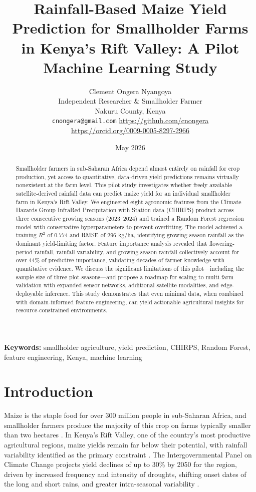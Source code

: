 \documentclass[11pt,a4paper]{article}
\title{Rainfall-Based Maize Yield Prediction for Smallholder Farms\\in Kenya's Rift Valley: A Pilot Machine Learning Study}
\author{
Clement Ongera Nyangoya\\[0.3em]
\small Independent Researcher \& Smallholder Farmer\\
\small Nakuru County, Kenya\\[0.3em]
\small \texttt{cnongera@gmail.com} \quad \url{https://github.com/cnongera}\\[0.3em]
\small \url{https://orcid.org/0009-0005-8297-2966}
}
\date{May 2026}
\begin{document}
\maketitle

\begin{abstract}
Smallholder farmers in sub-Saharan Africa depend almost entirely on rainfall for crop production, yet access to quantitative, data-driven yield predictions remains virtually nonexistent at the farm level. This pilot study investigates whether freely available satellite-derived rainfall data can predict maize yield for an individual smallholder farm in Kenya's Rift Valley. We engineered eight agronomic features from the Climate Hazards Group InfraRed Precipitation with Station data (CHIRPS) product across three consecutive growing seasons (2023--2024) and trained a Random Forest regression model with conservative hyperparameters to prevent overfitting. The model achieved a training $R^2$ of 0.774 and RMSE of 296 kg/ha, identifying growing-season rainfall as the dominant yield-limiting factor. Feature importance analysis revealed that flowering-period rainfall, rainfall variability, and growing-season rainfall collectively account for over 44\% of predictive importance, validating decades of farmer knowledge with quantitative evidence. We discuss the significant limitations of this pilot---including the sample size of three plot-seasons---and propose a roadmap for scaling to multi-farm validation with expanded sensor networks, additional satellite modalities, and edge-deployable inference. This study demonstrates that even minimal data, when combined with domain-informed feature engineering, can yield actionable agricultural insights for resource-constrained environments.
\end{abstract}

\textbf{Keywords:} smallholder agriculture, yield prediction, CHIRPS, Random Forest, feature engineering, Kenya, machine learning

\section{Introduction}

Maize is the staple food for over 300 million people in sub-Saharan Africa, and smallholder farmers produce the majority of this crop on farms typically smaller than two hectares \cite{faostat2023}. In Kenya's Rift Valley, one of the country's most productive agricultural regions, maize yields remain far below their potential, with rainfall variability identified as the primary constraint \cite{waithaka2006}. The Intergovernmental Panel on Climate Change projects yield declines of up to 30\% by 2050 for the region, driven by increased frequency and intensity of droughts, shifting onset dates of the long and short rains, and greater intra-seasonal variability \cite{ipcc2022}.
\end{document}
